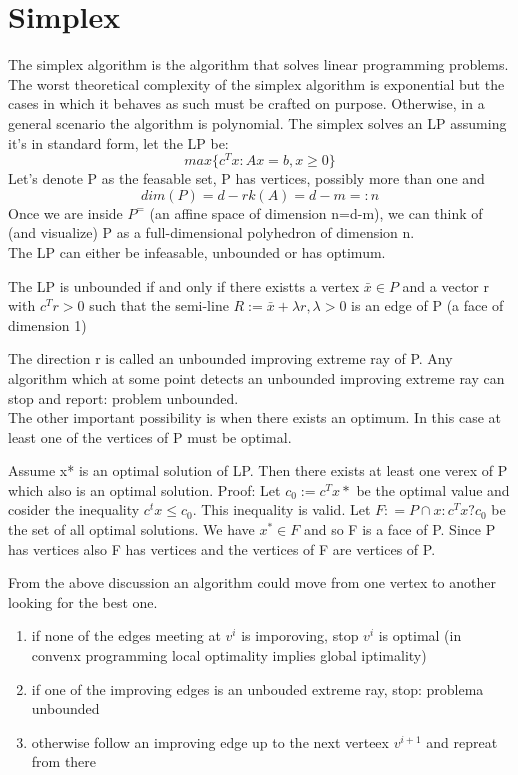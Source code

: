 \section*{Simplex}
The simplex algorithm is the algorithm that solves linear programming problems. The worst theoretical complexity of the simplex algorithm is exponential but the cases in which it behaves as such must be crafted on purpose. Otherwise, in a general scenario the algorithm is polynomial.
The simplex solves an LP assuming it's in standard form, let the LP be:
\[ 
    max\{c^Tx: Ax = b, x\geq 0\} 
\]
Let's denote P as the feasable set, P has vertices, possibly more than one and \[ 
    dim(P) = d - rk(A) = d-m =: n 
\]
Once we are inside $ P^= $ (an affine space of dimension n=d-m), we can think of (and visualize) P as a full-dimensional polyhedron of dimension n.\\
The LP can either be infeasable, unbounded or has optimum.
\begin{theorem}
    The LP is unbounded if and only if there existts a vertex $ \bar{x} \in P $  and a vector r with $c^Tr>0$ such that the semi-line $ R:={\bar{x}+\lambda r, \lambda >0} $ is an edge of P (a face of dimension 1) 
\end{theorem}
 The direction r is called an unbounded improving extreme ray of P. Any algorithm which at some point detects an unbounded improving extreme ray can stop and report: problem unbounded.\\ The other important possibility is when there exists an optimum. In this case at least one of the vertices of P must be optimal.
 \begin{theorem}
    Assume x* is an optimal solution of LP. Then there exists at least one verex of P which also is an optimal solution.
    Proof:
    Let $ c_0 := c^Tx*$ be the optimal value and cosider the inequality $ c^tx\leq c_0  $. This inequality is valid. Let $ F : = P \cap {x:c^Tx ? c_0} $ be the set of all optimal solutions. We have $ x^* \in F $ and so F is a face of P. Since P has vertices also F has vertices and the vertices of F are vertices of P. 
 \end{theorem}
 From the above discussion an algorithm could move from one vertex to another looking for the best one.
 \begin{enumerate}
    \item if none of the edges meeting at $v^{i}$ is imporoving, stop $v^i$ is optimal (in convenx programming local optimality implies global iptimality)
    \item if one of the improving edges is an unbouded extreme ray, stop: problema unbounded
    \item otherwise follow an improving edge up to the next verteex $v^{i+1}$ and repreat from there
 \end{enumerate}
